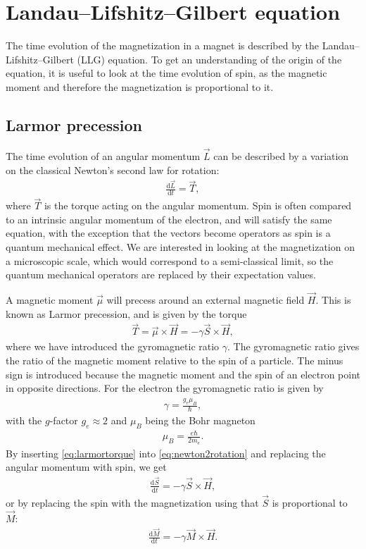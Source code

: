 \documentclass[12pt, a4paper]{article}		%
\numberwithin{equation}{section}
\begin{document}
\section{Landau--Lifshitz--Gilbert equation}
The time evolution of the magnetization in a magnet is described by the Landau--Lifshitz--Gilbert (LLG) equation. To get an understanding of the origin of the equation, it is useful to look at the time evolution of spin, as the magnetic moment and therefore the magnetization is proportional to it. 

\subsection{Larmor precession}
The time evolution of an angular momentum $\vec{L}$ can be described by a variation on the classical Newton's second law for rotation:
\begin{align}
\label{eq:newton2rotation}
\frac{\textrm{d} \vec{L}}{\textrm{d} t} = \vec{T},
\end{align}
where $\vec{T}$ is the torque acting on the angular momentum. Spin is often compared to an intrinsic angular momentum of the electron, and will satisfy the same equation, with the exception that the vectors become operators as spin is a quantum mechanical effect. We are interested in looking at the magnetization on a microscopic scale, which would correspond to a semi-classical limit, so the quantum mechanical operators are replaced by their expectation values. 

A magnetic moment $\vec{\mu}$ will precess around an external magnetic field $\vec{H}$. This is known as Larmor precession, and is given by the torque
\begin{align}
\label{eq:larmortorque}
\vec{T} = \vec{\mu} \times \vec{H} = -\gamma \vec{S} \times \vec{H},
\end{align}
where we have introduced the gyromagnetic ratio $\gamma$. The gyromagnetic ratio gives the ratio of the magnetic moment relative to the spin of a particle. The minus sign is introduced because the magnetic moment and the spin of an electron point in opposite directions. For the electron the gyromagnetic ratio is given by
\begin{align}
\gamma = \frac{g_e\mu_B}{\hbar},
\end{align}
with the $g$-factor $g_e \approx 2$ and $\mu_B$ being the Bohr magneton
\begin{align}
\mu_B = \frac{e\hbar}{2m_e}.
\end{align}
By inserting \eqref{eq:larmortorque} into \eqref{eq:newton2rotation} and replacing the angular momentum with spin, we get
\begin{align}
\frac{\textrm{d} \vec{S}}{\textrm{d} t} =- \gamma \vec{S} \times \vec{H},
\end{align}
or by replacing the spin with the magnetization using that $\vec{S}$ is proportional to $\vec{M}$:
\begin{align}
\label{eq:mag_undamped}
\frac{\textrm{d} \vec{M}}{\textrm{d} t} = -\gamma \vec{M} \times \vec{H}.
\end{align}
\end{document}
